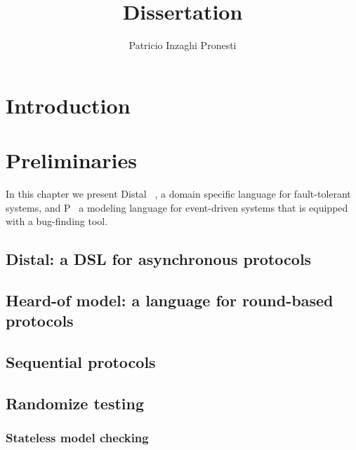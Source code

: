 \documentclass[11pt]{report}
\theoremstyle{plain}
\theoremstyle{definition}
\begin{document}
\title{Dissertation}
\author{Patricio Inzaghi Pronesti}
\maketitle

\begin{abstract}
    
\end{abstract}

\tableofcontents

\chapter{Introduction}
\label{intro}


\chapter{Preliminaries}
\label{preliminaries}
In this chapter we present Distal~ \cite{biely_distal_2013}, a domain specific language for fault-tolerant systems, and P~\cite{desai_p_2013} a modeling language for event-driven systems that is equipped with a bug-finding tool. 

    \section{Distal: a DSL for asynchronous protocols}
    \label{preliminaries:distal}
    

    \section{Heard-of model: a language for round-based protocols}
    \label{preliminaries:heardof}
    

    \section{Sequential protocols}
    \label{preliminaries:sequential}
    

    \section{Randomize testing}
    \label{preliminaries:testing}
    
        \subsection{Stateless model checking}
\end{document}
